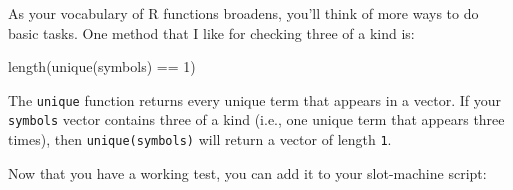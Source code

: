 \documentclass[
  letterpaper,
  DIV=11,
  numbers=noendperiod]{scrbook}
\newenvironment{Shaded}{\begin{snugshade}}{\end{snugshade}}
\newcommand{\CommentTok}[1]{\textcolor[rgb]{0.37,0.37,0.37}{#1}}
\newcommand{\ControlFlowTok}[1]{\textcolor[rgb]{0.00,0.23,0.31}{\textbf{#1}}}
\newcommand{\DecValTok}[1]{\textcolor[rgb]{0.68,0.00,0.00}{#1}}
\newcommand{\ErrorTok}[1]{\textcolor[rgb]{0.68,0.00,0.00}{#1}}
\newcommand{\FunctionTok}[1]{\textcolor[rgb]{0.28,0.35,0.67}{#1}}
\newcommand{\NormalTok}[1]{\textcolor[rgb]{0.00,0.23,0.31}{#1}}
\newcommand{\OtherTok}[1]{\textcolor[rgb]{0.00,0.23,0.31}{#1}}
\newcommand{\SpecialCharTok}[1]{\textcolor[rgb]{0.37,0.37,0.37}{#1}}
\begin{document}
As your vocabulary of R functions broadens, you'll think of more ways to
do basic tasks. One method that I like for checking three of a kind is:

\begin{Shaded}
\begin{Highlighting}[]
\FunctionTok{length}\NormalTok{(}\FunctionTok{unique}\NormalTok{(symbols) }\SpecialCharTok{==} \DecValTok{1}\NormalTok{)}
\end{Highlighting}
\end{Shaded}

The \texttt{unique} function returns every unique term that appears in a
vector. If your \texttt{symbols} vector contains three of a kind (i.e.,
one unique term that appears three times), then \texttt{unique(symbols)}
will return a vector of length \texttt{1}.

Now that you have a working test, you can add it to your slot-machine
script:

\begin{Shaded}
\end{Shaded}
\end{document}
